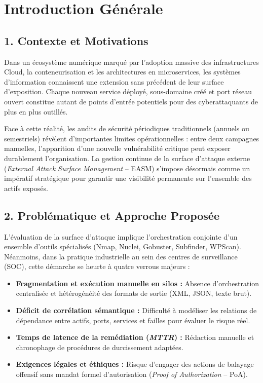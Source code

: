 \chapter*{Introduction G\'en\'erale}

\section*{1. Contexte et Motivations}
\par Dans un \'ecosyst\`eme num\'erique marqu\'e par l'adoption massive des infrastructures Cloud, la conteneurisation et les architectures en microservices, les syst\`emes d'information connaissent une extension sans pr\'ec\'edent de leur surface d'exposition. Chaque nouveau service d\'eploy\'e, sous-domaine cr\'e\'e et port r\'eseau ouvert constitue autant de points d'entr\'ee potentiels pour des cyberattaquants de plus en plus outill\'es.
\par Face \`a cette r\'ealit\'e, les audits de s\'ecurit\'e p\'eriodiques traditionnels (annuels ou semestriels) r\'ev\`elent d'importantes limites op\'erationnelles : entre deux campagnes manuelles, l'apparition d'une nouvelle vuln\'erabilit\'e critique peut exposer durablement l'organisation. La gestion continue de la surface d'attaque externe (\textit{External Attack Surface Management} -- EASM) s'impose d\'esormais comme un imp\'eratif strat\'egique pour garantir une visibilit\'e permanente sur l'ensemble des actifs expos\'es.

\section*{2. Probl\'ematique et Approche Propos\'ee}
\par L'\'evaluation de la surface d'attaque implique l'orchestration conjointe d'un ensemble d'outils sp\'ecialis\'es (Nmap, Nuclei, Gobuster, Subfinder, WPScan). N\'eanmoins, dans la pratique industrielle au sein des centres de surveillance (SOC), cette d\'emarche se heurte \`a quatre verrous majeurs :
\begin{itemize}
    \item \textbf{Fragmentation et ex\'ecution manuelle en silos :} Absence d'orchestration centralis\'ee et h\'et\'erog\'en\'eit\'e des formats de sortie (XML, JSON, texte brut).
    \item \textbf{D\'eficit de corr\'elation s\'emantique :} Difficult\'e \`a mod\'eliser les relations de d\'ependance entre actifs, ports, services et failles pour \'evaluer le risque r\'eel.
    \item \textbf{Temps de latence de la rem\'ediation (\textit{MTTR}) :} R\'edaction manuelle et chronophage de proc\'edures de durcissement adapt\'ees.
    \item \textbf{Exigences l\'egales et \'ethiques :} Risque d'engager des actions de balayage offensif sans mandat formel d'autorisation (\textit{Proof of Authorization} -- PoA).
\end{itemize}

